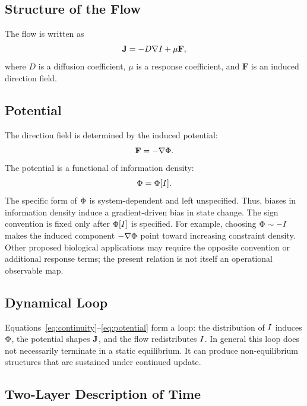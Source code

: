 \subsection{Structure of the Flow}

The flow is written as
\begin{equation}
  \mathbf{J} = -D\nabla I + \mu \mathbf{F},
  \label{eq:flow}
\end{equation}
where \(D\) is a diffusion coefficient, \(\mu\) is a response coefficient, and \(\mathbf{F}\) is an induced direction field.

\subsection{Potential}

The direction field is determined by the induced potential:
\begin{equation}
  \mathbf{F} = -\nabla \Phi.
  \label{eq:force}
\end{equation}
The potential is a functional of information density:
\begin{equation}
  \Phi = \Phi[I].
  \label{eq:potential}
\end{equation}
The specific form of \(\Phi\) is system-dependent and left unspecified.
Thus, biases in information density induce a gradient-driven bias in state change.
The sign convention is fixed only after \(\Phi[I]\) is specified.
For example, choosing \(\Phi\sim-I\) makes the induced component
\(-\nabla\Phi\) point toward increasing constraint density.
Other proposed biological applications may require the opposite convention or additional
response terms; the present relation is not itself an operational observable map.

\subsection{Dynamical Loop}

Equations~\eqref{eq:continuity}--\eqref{eq:potential} form a loop: the distribution of \(I\) induces \(\Phi\), the potential shapes \(\mathbf{J}\), and the flow redistributes \(I\). In general this loop does not necessarily terminate in a static equilibrium. It can produce non-equilibrium structures that are sustained under continued update.

\subsection{Two-Layer Description of Time}


